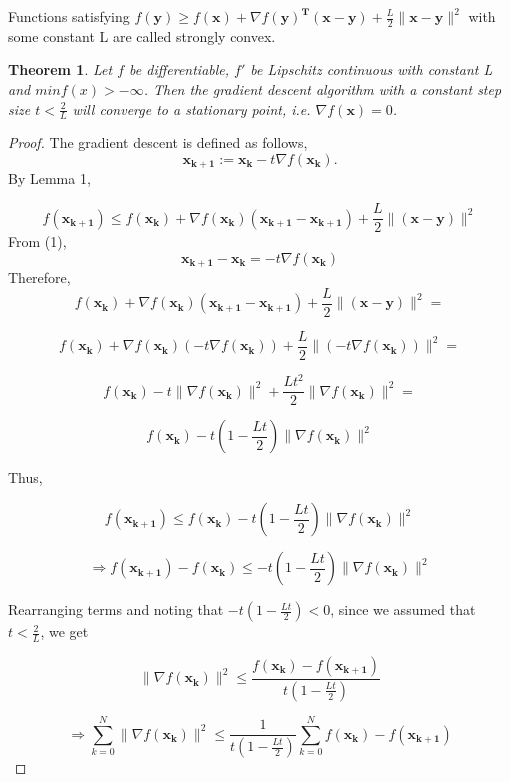 \documentclass{article}
\newtheorem{theorem}{Theorem}
\begin{document}
Functions satisfying $f(\mathbf{y}) \geq f(\mathbf{x}) + \nabla f(\mathbf{y})^\mathbf{T} (\mathbf{x}-\mathbf{y}) + \frac{L}{2} \|\mathbf{x}-\mathbf{y}\|^2$ with some constant L are called strongly convex.

\begin{theorem}
Let $f$ be differentiable, $f'$ be Lipschitz continuous with constant L and $minf(x)>-\infty$. Then the gradient descent algorithm with a constant step size $t<\frac{2}{L}$ will converge to a stationary point, i.e. $\nabla f(\mathbf{x})=0$.
\end{theorem}

\begin{proof}
The gradient descent is defined as follows,
\begin{equation}
\mathbf{x_{k+1}}:=\mathbf{x_{k}}-t\nabla f(\mathbf{x_k}).
\end{equation}
\newline
By Lemma 1,

$$f(\mathbf{x_{k+1}}) \leq f(\mathbf{x_{k}})+ \nabla f(\mathbf{x_{k}})(\mathbf{x_{k+1}}-\mathbf{x_{k+1}})+ \frac{L}{2}\|(\mathbf{x}-\mathbf{y})\|^2$$
From (1),
$$\mathbf{x_{k+1}}-\mathbf{x_{k}}=-t\nabla f(\mathbf{x_k})$$
Therefore,
$$f(\mathbf{x_{k}})+ \nabla f(\mathbf{x_{k}})(\mathbf{x_{k+1}}-\mathbf{x_{k+1}})+ \frac{L}{2}\|(\mathbf{x}-\mathbf{y})\|^2=$$

$$f(\mathbf{x_{k}})+ \nabla f(\mathbf{x_{k}})(-t\nabla f(\mathbf{x_k}))+ \frac{L}{2}\|(-t\nabla f(\mathbf{x_k}))\|^2=$$

$$f(\mathbf{x_{k}})-t\|\nabla f(\mathbf{x_k})\|^2+ \frac{Lt^2}{2}\|\nabla f(\mathbf{x_k})\|^2=$$

$$f(\mathbf{x_{k}})-t(1 - \frac{Lt}{2}) \| \nabla f(\mathbf{x_k})\|^2$$

Thus,

$$f(\mathbf{x_{k+1}}) \leq f(\mathbf{x_{k}})-t(1 - \frac{Lt}{2}) \| \nabla f(\mathbf{x_k})\|^2$$

$$\Rightarrow f(\mathbf{x_{k+1}}) - f(\mathbf{x_{k}}) \leq -t(1 - \frac{Lt}{2}) \| \nabla f(\mathbf{x_k})\|^2$$

Rearranging terms and noting that $-t(1 - \frac{Lt}{2}) < 0$, since we assumed that $t<\frac{2}{L}$, we get

$$\| \nabla f(\mathbf{x_k})\|^2 \leq \frac{f(\mathbf{x_{k}}) - f(\mathbf{x_{k+1}})}{t(1 - \frac{Lt}{2})}$$

$$\Rightarrow\sum_{k=0}^{N} \| \nabla f(\mathbf{x_k})\|^2 \leq \frac{1}{t(1 - \frac{Lt}{2})} \sum_{k=0}^{N} f(\mathbf{x_{k}}) - f(\mathbf{x_{k+1}})$$


\end{proof}
\end{document}
